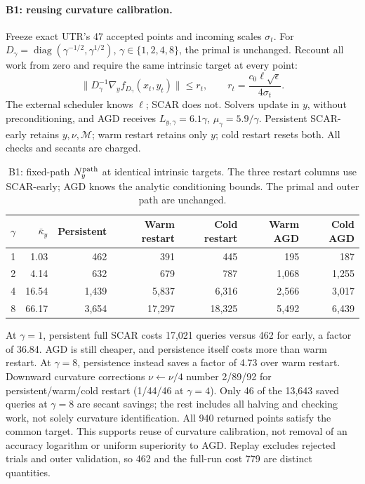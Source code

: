 \paragraph{B1: reusing curvature calibration.}
Freeze exact UTR's 47 accepted points and incoming scales $\sigma_t$.
For $D_\gamma=\operatorname{diag}(\gamma^{-1/2},\gamma^{1/2})$,
$\gamma\in\{1,2,4,8\}$, the primal is unchanged. Recount all work from
zero and require the same intrinsic target at every point:
\begin{equation}
 \|D_\gamma^{-1}\nabla_yf_{D_\gamma}(x_t,y_t)\|\le r_t,
 \qquad r_t=\frac{c_0\ell\sqrt\epsilon}{4\sigma_t}.
 \label{eq:exp-b-intrinsic}
\end{equation}
The external scheduler knows $\ell$; SCAR does not. Solvers update in
$y$, without preconditioning, and AGD receives
$L_{y,\gamma}=6.1\gamma$, $\mu_\gamma=5.9/\gamma$.
Persistent SCAR-early retains $y,\nu,\mathcal M$; warm restart retains
only $y$; cold restart resets both. All checks and secants are charged.

\begin{table}[tb]
\centering\small
\setlength{\tabcolsep}{4.5pt}
\begin{tabular}{rrrrrrr}
\toprule
$\gamma$ & $\bar\kappa_y$ & Persistent & Warm restart & Cold restart & Warm AGD & Cold AGD\\
\midrule
1 & 1.03 & 462 & 391 & 445 & 195 & 187\\
2 & 4.14 & 632 & 679 & 787 & 1,068 & 1,255\\
4 & 16.54 & 1,439 & 5,837 & 6,316 & 2,566 & 3,017\\
8 & 66.17 & 3,654 & 17,297 & 18,325 & 5,492 & 6,439\\
\bottomrule
\end{tabular}
\caption{B1: fixed-path $N_y^{\rm path}$ at identical intrinsic targets.
The three restart columns use SCAR-early; AGD knows the analytic
conditioning bounds. The primal and outer path are unchanged.}
\label{tab:exp-b-conditioning}
\end{table}

At $\gamma=1$, persistent full SCAR costs 17,021 queries versus 462
for early, a factor of 36.84. AGD is still cheaper, and persistence
itself costs more than warm restart. At $\gamma=8$, persistence instead
saves a factor of 4.73 over warm restart. Downward curvature corrections
$\nu\leftarrow\nu/4$ number 2/89/92 for persistent/warm/cold restart
(1/44/46 at $\gamma=4$). Only 46 of the 13,643 saved queries at
$\gamma=8$ are secant savings; the rest includes all halving and checking
work, not solely curvature identification. All 940 returned points
satisfy the common target. This supports reuse of curvature calibration, not removal of an
accuracy logarithm or uniform superiority to AGD. Replay excludes rejected trials and outer validation, so 462
and the full-run cost 779 are distinct quantities.

